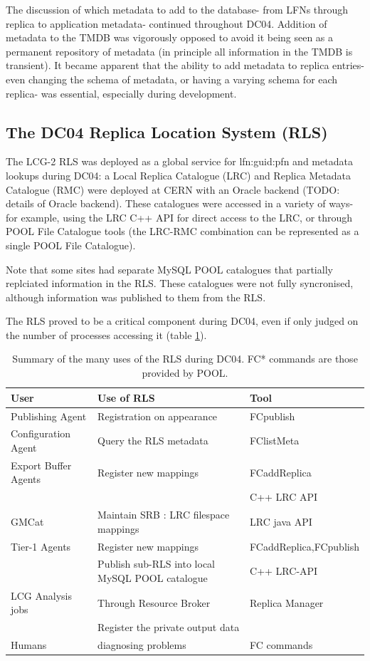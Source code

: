 \documentclass{cmspaper}
\begin{document}
The discussion of which metadata to add to the database- from LFNs
through replica to application metadata- continued throughout
DC04. Addition of metadata to the TMDB was vigorously opposed to avoid
it being seen as a permanent repository of metadata (in principle all
information in the TMDB is transient). It became apparent that the
ability to add metadata to replica entries- even changing the schema
of metadata, or having a varying schema for each replica- was
essential, especially during development.

\subsection{The DC04 Replica Location System (RLS)}
The LCG-2 RLS was deployed as a global service for lfn:guid:pfn and metadata lookups during DC04: a Local Replica Catalogue (LRC) and Replica Metadata Catalogue (RMC) were deployed at CERN with an Oracle backend (TODO: details of Oracle backend). These catalogues were accessed in a variety of ways- for example, using the LRC C++ API for direct access to the LRC, or through POOL File Catalogue tools (the LRC-RMC combination can be represented as a single POOL File Catalogue).

Note that some sites had separate MySQL POOL catalogues that partially replciated information in the RLS. These catalogues were not fully syncronised, although information was published to them from the RLS.

The RLS proved to be a critical component during DC04, even if only judged on the number of processes accessing it (table \ref{table:rls}).

\begin{table}
\begin{tabular}[tbp]{|l|l|l|}
\hline User & Use of RLS & Tool
\\ \hline Publishing Agent & Registration on appearance & FCpublish
\\ Configuration Agent & Query the RLS metadata & FClistMeta
\\ Export Buffer Agents & Register new mappings & FCaddReplica
\\ & & C++ LRC API
\\ GMCat & Maintain SRB : LRC filespace mappings & LRC java API
\\ Tier-1 Agents & Register new mappings & FCaddReplica,FCpublish
\\ & Publish sub-RLS into local MySQL POOL catalogue & C++ LRC-API
\\ LCG Analysis jobs & Through Resource Broker & Replica Manager
\\ & Register the private output data & 
\\ Humans & diagnosing problems & FC commands
\\ \hline
\end{tabular}
\label{table:rls}
\caption{Summary of the many uses of the RLS during DC04. FC* commands are those provided by POOL.}
\end{table}
\end{document}
